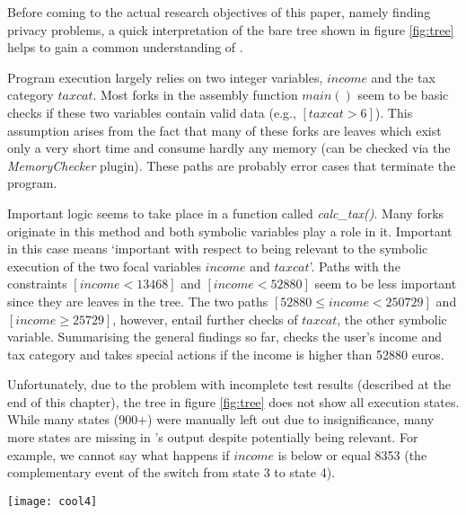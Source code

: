 \medskip

Before coming to the actual research objectives of this paper, namely finding privacy problems, a quick interpretation of the bare tree shown in figure \ref{fig:tree} helps to gain a common understanding of \app.

Program execution largely relies on two integer variables, $income$ and the tax category $taxcat$.
Most forks in the assembly function $main()$ seem to be basic checks if these two variables contain valid data (e.g., $[taxcat > 6]$).
This assumption arises from the fact that many of these forks are leaves which exist only a very short time and consume hardly any memory (can be checked via the \textit{MemoryChecker} plugin).
These paths are probably error cases that terminate the program.

Important logic seems to take place in a function called \textit{calc\_tax()}.
Many forks originate in this method and both symbolic variables play a role in it.
Important in this case means `important with respect to being relevant to the symbolic execution of the two focal variables $income$ and $taxcat$'.
Paths with the constraints $[income < 13468]$ and $[income < 52880]$ seem to be less important since they are leaves in the tree.
The two paths $[52880 \le income < 250729]$ and $[income \ge 25729]$, however, entail further checks of $taxcat$, the other symbolic variable.
Summarising the general findings so far, \app checks the user's income and tax category and takes special actions if the income is higher than 52880 euros.

Unfortunately, due to the problem with incomplete test results (described at the end of this chapter), the tree in figure \ref{fig:tree} does not show all execution states.
While many states (900+) were manually left out due to insignificance, many more states are missing in \sse's output despite potentially being relevant.
For example, we cannot say what happens if $income$ is below or equal 8353 (the complementary event of the switch from state 3 to state 4).

\begin{figure*}
\texttt{[image: cool4]}
\caption{Tree visualisation for understanding path forking behaviour in the analysis of \app. Shows at which memory addresses \sse forked new execution states. Path constraints are printed at each state transition. For most states, the \textit{TestCaseGenerator} found meaningful concrete example values for the two symbolic variables $income$ and $taxcat$. Blue dots symbolise that in this state a ``donation'' message was transferred to a server. Red dots mark states which leak the complete set of user inputs.}
\label{fig:tree}
\end{figure*}

